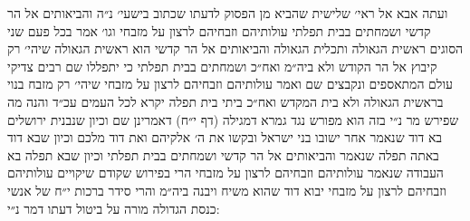 \documentclass[12pt, openany]{book}
\begin{document}
\begin{multicols}{2}
ועתה אבא אל ראי׳ שלישית שהביא מן הפסוק לדעתו שכתוב בישעי׳ נ״ה והביאותים אל הר קדשי ושמחתים בבית תפלתי עולותיהם וזבחיהם לרצון על מזבחי וגו׳ אמר בכל פעם שני הסוגים ראשית הגאולה ותכלית הגאולה והביאותים אל הר קדשי הוא ראשית הגאולה שיהי׳ רק קיבוץ אל הר הקודש ולא ביה״מ ואח״כ ושמחתים בבית תפלתי כי יתפללו שם רבים צדיקי עולם המתאספים ונקבצים שם ואמר עולותיהם וזבחיהם לרצון על מזבחי שיהי׳ רק מזבח בנוי בראשית הגאולה ולא בית המקדש ואח״כ ביתי בית תפלה יקרא לכל העמים עכ״ד והנה מה שפירש מר נ״י בזה הוא מפורש נגד גמרא דמגילה (דף י״ח) דאמרינן שם וכיון שנבנית ירושלים בא דוד שנאמר אחר ישובו בני ישראל ובקשו את ה׳ אלקיהם ואת דוד מלכם וכיון שבא דוד באתה תפלה שנאמר והביאותים אל הר קדשי ושמחתים בבית תפלתי וכיון שבא תפלה בא העבודה שנאמר עולותיהם וזבחיהם לרצון על מזבחי הרי בפירוש שקודם שיקויים עולותיהם וזבחיהם לרצון על מזבחי יבוא דוד שהוא משיח ויבנה ביה״מ והרי סידר ברכות י״ח של אנשי כנסת הגדולה מורה על ביטול דעתו דמר נ״י:\\\vspace{0pt}


\end{multicols}
\end{document}

